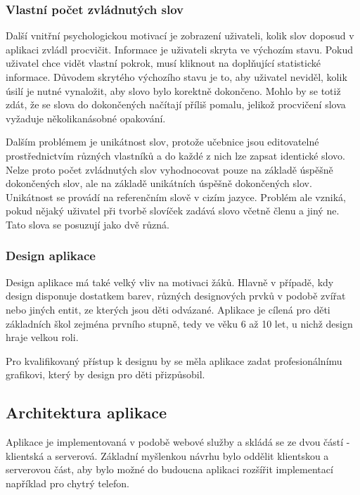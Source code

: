 \documentclass[a4paper,11pt,titlepage,fleqn]{article}
\begin{document}
        \subsubsection{Vlastní počet zvládnutých slov}
            Další vnitřní psychologickou motivací je zobrazení uživateli, kolik slov doposud v aplikaci zvládl procvičit. Informace je uživateli skryta ve výchozím stavu. Pokud uživatel chce vidět vlastní pokrok, musí kliknout na doplňující statistické informace. Důvodem skrytého výchozího stavu je to, aby uživatel neviděl, kolik úsilí je nutné vynaložit, aby slovo bylo korektně dokončeno. Mohlo by se totiž zdát, že se slova do dokončených načítají příliš pomalu, jelikož procvičení slova vyžaduje několikanásobné opakování. 

            Dalším problémem je unikátnost slov, protože učebnice jsou editovatelné prostřednictvím různých vlastníků a do každé z nich lze zapsat identické slovo. Nelze proto počet zvládnutých slov vyhodnocovat pouze na základě úspěšně dokončených slov, ale na základě unikátních úspěšně dokončených slov. Unikátnost se provádí na referenčním slově v cizím jazyce. Problém ale vzniká, pokud nějaký uživatel při tvorbě slovíček zadává slovo včetně členu a jiný ne. Tato slova se posuzují jako dvě různá.

        \subsubsection{Design aplikace}
            Design aplikace má také velký vliv na motivaci žáků. Hlavně v případě, kdy design disponuje dostatkem barev, různých designových prvků v podobě zvířat nebo jiných entit, ze kterých jsou děti odvázané. Aplikace je cílená pro děti základních škol zejména prvního stupně, tedy ve věku 6 až 10 let, u nichž design hraje velkou roli. 


            Pro kvalifikovaný přístup k designu by se měla aplikace zadat profesionálnímu grafikovi, který by design pro děti přizpůsobil.

    \subsection{Architektura aplikace}
        Aplikace je implementovaná v podobě webové služby a skládá se ze dvou částí - klientská a serverová. Základní myšlenkou návrhu bylo oddělit klientskou a serverovou část, aby bylo možné do budoucna aplikaci rozšířit implementací například pro chytrý telefon.
\end{document}
